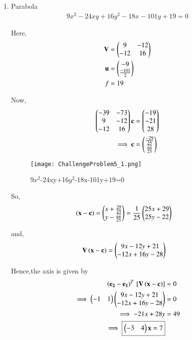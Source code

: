 \documentclass[journal,12pt,twocolumn]{IEEEtran}
\begin{document}
\begin{enumerate}
    \item Parabola
    \begin{align}
    9x^2-24xy+16y^2-18x-101y+19 = 0
    \end{align}
    
    Here,
    \begin{align}
    \mathbf{V} &= \begin{pmatrix}9 & -12 \\ -12 & 16\end{pmatrix} \\
    \mathbf{u} &= \begin{pmatrix}-9 \\ \frac{-101}{2}\end{pmatrix} \\
    f &= 19
    \end{align}

    Now,
    \begin{align}
    \begin{pmatrix}-39 & -73 \\ 9 & -12 \\ -12 & 16\end{pmatrix}\mathbf{c} &= \begin{pmatrix}-19 \\ -21 \\ 28\end{pmatrix}
    \\
    \implies \mathbf{c} &= \begin{pmatrix}\frac{-29}{25} \\ \frac{22}{25}\end{pmatrix}
    \end{align}
    
    \begin{figure}[!ht]
    \centering
    \texttt{[image: ChallengeProblem5\_1.png]}
    \caption{9$x^2$-24xy+16$y^2$-18x-101y+19=0}
    \label{ex1}	
    \end{figure}

    So,
    \begin{align}
    \left(\mathbf{x}-\mathbf{c}\right) &= \begin{pmatrix}x+\frac{29}{25} \\ y-\frac{22}{25}\end{pmatrix}=\frac{1}{25}\begin{pmatrix}25x+29 \\ 25y-22\end{pmatrix}
    \end{align}

    and,
    \begin{align}
    \mathbf{V}\left(\mathbf{x}-\mathbf{c}\right) &= \begin{pmatrix}9x-12y+21 \\ -12x+16y-28\end{pmatrix}
    \end{align}

    Hence,the axis is given by
    \begin{align}
    \left(\mathbf{e_2}-\mathbf{e_1}\right)^T{}\left[\mathbf{V}\left(\mathbf{x}-\mathbf{c}\right)\right] &= 0\\
    \implies \begin{pmatrix}-1 & 1\end{pmatrix}\begin{pmatrix}9x-12y+21 \\ -12x+16y-28\end{pmatrix} &= 0
    \\
    \implies -21x + 28y &= 49 \\
    \implies \boxed{\begin{pmatrix}-3 & 4\end{pmatrix}\mathbf{x} = 7}
    \end{align}
    

\end{enumerate}
\end{document}

